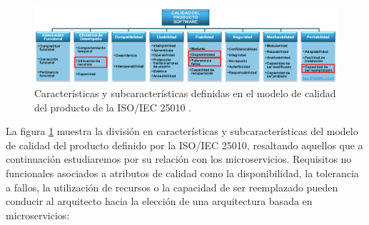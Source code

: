 \documentclass[11pt,spanish,listoffigures]{tfgetsinf}
\begin{document}
\begin{figure}[h]
\centering
\includegraphics[scale=0.5]{iso25010}
\caption{Características y subcaracterísticas definidas en el modelo de calidad del producto de la ISO/IEC 25010 \cite{Standard2010}.}
\label{fig:iso25010}
\end{figure}

La figura \ref{fig:iso25010} muestra la división en características y subcaracterísticas del modelo de calidad del producto definido por la ISO/IEC 25010, resaltando aquellos que a continuación estudiaremos por su relación con los microservicios. Requisitos no funcionales asociados a atributos de calidad como la disponibilidad, la tolerancia a fallos, la utilización de recursos o la capacidad de ser reemplazado pueden conducir al arquitecto hacia la elección de una arquitectura basada en microservicios:
\end{document}
